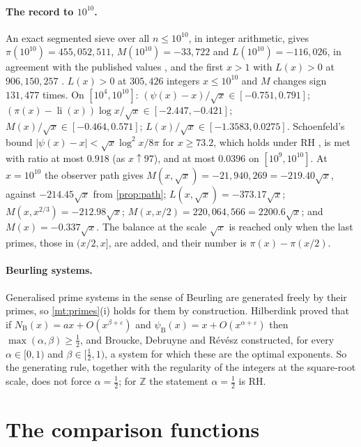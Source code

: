 \documentclass[11pt]{article}
\theoremstyle{definition}\newtheorem{definition}[theorem]{Definition}
\theoremstyle{remark}\newtheorem{remark}[theorem]{Remark}
\begin{document}
\paragraph{The record to $10^{10}$.} An exact segmented sieve over all $n\le10^{10}$, in integer arithmetic, gives $\pi(10^{10})=455{,}052{,}511$, $M(10^{10})=-33{,}722$ and $L(10^{10})=-116{,}026$, in agreement with the published values \cite{OEISpi,OEISM,OEISL}, and the first $x>1$ with $L(x)>0$ at $906{,}150{,}257$ \cite{Tanaka}. $L(x)>0$ at $305{,}426$ integers $x\le10^{10}$ and $M$ changes sign $131{,}477$ times. On $[10^4,10^{10}]$: $(\psi(x)-x)/\sqrt x\in[-0.751,0.791]$; $(\pi(x)-\operatorname{li}(x))\log x/\sqrt x\in[-2.447,-0.421]$; $M(x)/\sqrt x\in[-0.464,0.571]$; $L(x)/\sqrt x\in[-1.3583,0.0275]$. Schoenfeld's bound $|\psi(x)-x|<\sqrt x\log^2x/8\pi$ for $x\ge73.2$, which holds under RH \cite{Schoenfeld}, is met with ratio at most $0.918$ (as $x\uparrow97$), and at most $0.0396$ on $[10^9,10^{10}]$. At $x=10^{10}$ the observer path gives $M(x,\sqrt x)=-21{,}940{,}269=-219.40\sqrt x$, against $-214.45\sqrt x$ from \cref{prop:path}; $L(x,\sqrt x)=-373.17\sqrt x$; $M(x,x^{2/3})=-212.98\sqrt x$; $M(x,x/2)=220{,}064{,}566=2200.6\sqrt x$; and $M(x)=-0.337\sqrt x$. The balance at the scale $\sqrt x$ is reached only when the last primes, those in $(x/2,x]$, are added, and their number is $\pi(x)-\pi(x/2)$.

\paragraph{Beurling systems.} Generalised prime systems in the sense of Beurling are generated freely by their primes, so \cref{mt:primes}(i) holds for them by construction. Hilberdink \cite{Hilberdink} proved that if $N_{\mathrm B}(x)=ax+O(x^{\beta+\varepsilon})$ and $\psi_{\mathrm B}(x)=x+O(x^{\alpha+\varepsilon})$ then $\max(\alpha,\beta)\ge\frac12$, and Broucke, Debruyne and R\'ev\'esz \cite{BDR} constructed, for every $\alpha\in[0,1)$ and $\beta\in[\frac12,1)$, a system for which these are the optimal exponents. So the generating rule, together with the regularity of the integers at the square-root scale, does not force $\alpha=\frac12$; for $\mathbb Z$ the statement $\alpha=\frac12$ is RH.

\section{The comparison functions}\label{sec:compare}
\end{document}
